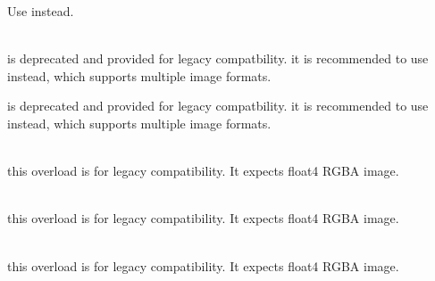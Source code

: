 \begin{DoxyRefList}
\label{deprecated__deprecated000022}%
%
Use  instead.  
\item[{\parbox[t]{\linewidth}{Member \doxylink{group__image_ga01b651fa2b5b3dec7d304173780378d1}{save\+Image\+RGBA} (const char \texorpdfstring{$\ast$}{*}filename, float4 \texorpdfstring{$\ast$}{*}ptr, int width, int height, float max\+\_\+pixel=255.\+0f, int quality=100, cuda\+Stream\+\_\+t stream=0)}}]\hfill \\
\label{deprecated__deprecated000018}%
%
 is deprecated and provided for legacy compatbility. it is recommended to use  instead, which supports multiple image formats.



\label{deprecated__deprecated000030}%
%
 is deprecated and provided for legacy compatbility. it is recommended to use  instead, which supports multiple image formats.


\item[{\parbox[t]{\linewidth}{Member \doxylink{classseg_net_a656d709bbfb00fb0b9b4d55296aae463}{seg\+Net::\+Mask} (float \texorpdfstring{$\ast$}{*}output, uint32\+\_\+t width, uint32\+\_\+t height, \doxylink{classseg_net_a5579582306d8b98e3a8acf2b73e13ea0}{Filter\+Mode} filter=FILTER\+\_\+\+LINEAR)}}]\hfill \\
\label{deprecated__deprecated000008}%
%
this overload is for legacy compatibility. It expects float4 RGBA image.  
\item[{\parbox[t]{\linewidth}{Member \doxylink{classseg_net_a3a670c08ad8b13db6ee092c59efe88b8}{seg\+Net::\+Overlay} (float \texorpdfstring{$\ast$}{*}output, uint32\+\_\+t width, uint32\+\_\+t height, \doxylink{classseg_net_a5579582306d8b98e3a8acf2b73e13ea0}{Filter\+Mode} filter=FILTER\+\_\+\+LINEAR)}}]\hfill \\
\label{deprecated__deprecated000009}%
%
this overload is for legacy compatibility. It expects float4 RGBA image.  
\item[{\parbox[t]{\linewidth}{Member \doxylink{classseg_net_a2fe1beec3215b5d7744420b57ba397c4}{seg\+Net::\+Process} (float \texorpdfstring{$\ast$}{*}input, uint32\+\_\+t width, uint32\+\_\+t height, const char \texorpdfstring{$\ast$}{*}ignore\+\_\+class="{}void"{})}}]\hfill \\
\label{deprecated__deprecated000007}%
%
this overload is for legacy compatibility. It expects float4 RGBA image. 
\end{DoxyRefList}